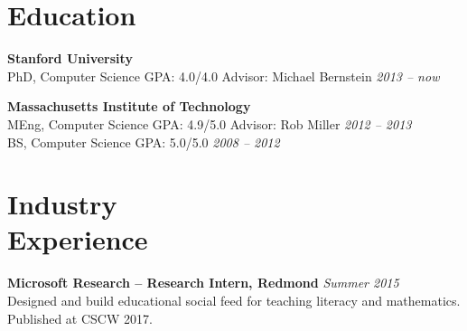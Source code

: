 \documentclass[margin,line]{resume}
\begin{document}
\vspace{-5.0mm}

\begin{resume}

\section{\mysidestyle Education}

\textbf{Stanford University} \vspace{0mm}\\\vspace{0mm}%
PhD, Computer Science  \hspace{2.5mm} GPA: 4.0/4.0 \hspace{30mm} Advisor: Michael Bernstein \hfill \textsl{2013 -- now}

\textbf{Massachusetts Institute of Technology} \vspace{0mm}\\\vspace{0mm}%
MEng, Computer Science \hspace{0mm} GPA: 4.9/5.0 \hspace{30mm} Advisor: Rob Miller \hfill \textsl{2012 -- 2013}\\\vspace{1mm}%
BS, Computer Science \hspace{4.5mm} GPA: 5.0/5.0 \hfill \textsl{2008 -- 2012}\vspace{-0.8mm}

\section{\mysidestyle Industry\\Experience}

\textbf{Microsoft Research -- Research Intern, Redmond} \hfill \textsl{Summer 2015}\\
Designed and build educational social feed for teaching literacy and mathematics. Published at CSCW 2017.


\end{resume}
\end{document}
